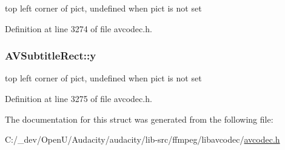 top left corner of pict, undefined when pict is not set 



Definition at line 3274 of file avcodec.\+h.

\subsubsection[{\texorpdfstring{y}{y}}]{ A\+V\+Subtitle\+Rect\+::y}\hypertarget{struct_a_v_subtitle_rect_ab9e5fdd0c592636abf46530b110311bb}{}\label{struct_a_v_subtitle_rect_ab9e5fdd0c592636abf46530b110311bb}


top left corner of pict, undefined when pict is not set 



Definition at line 3275 of file avcodec.\+h.



The documentation for this struct was generated from the following file\+:\begin{DoxyCompactItemize}
\item 
C\+:/\+\_\+dev/\+Open\+U/\+Audacity/audacity/lib-\/src/ffmpeg/libavcodec/\hyperlink{avcodec_8h}{avcodec.\+h}\end{DoxyCompactItemize}
